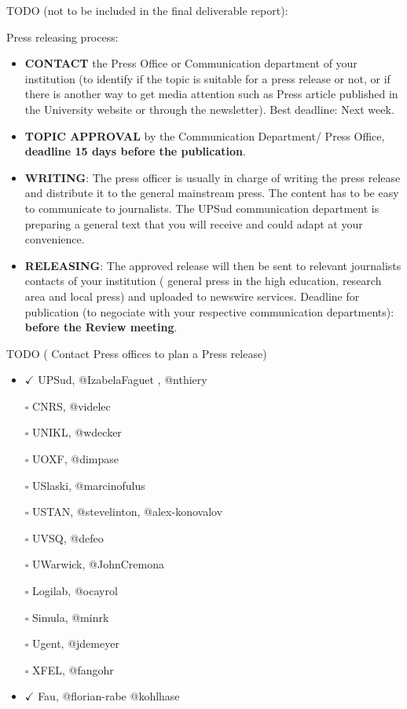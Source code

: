 TODO (not to be included in the final deliverable report):

Press releasing process:

\begin{itemize}
\item
  \textbf{CONTACT} the Press Office or Communication department of your
  institution (to identify if the topic is suitable for a press release
  or not, or if there is another way to get media attention such as
  Press article published in the University website or through the
  newsletter). Best deadline: Next week.
\item
  \textbf{TOPIC APPROVAL} by the Communication Department/ Press Office,
  \textbf{deadline 15 days before the publication}.
\item
  \textbf{WRITING}: The press officer is usually in charge of writing
  the press release and distribute it to the general mainstream press.
  The content has to be easy to communicate to journalists. The UPSud
  communication department is preparing a general text that you will
  receive and could adapt at your convenience.
\item
  \textbf{RELEASING}: The approved release will then be sent to relevant
  journalists contacts of your institution ( general press in the high
  education, research area and local press) and uploaded to newswire
  services. Deadline for publication (to negociate with your respective
  communication departments): \textbf{before the Review meeting}.
\end{itemize}

TODO ( Contact Press offices to plan a Press release)

\begin{itemize}
\tightlist
\item
  \(\checkmark\) UPSud, @IzabelaFaguet , @nthiery
\item[$\square$]
  CNRS, @videlec
\item[$\square$]
  UNIKL, @wdecker
\item[$\square$]
  UOXF, @dimpase
\item[$\square$]
  USlaski, @marcinofulus
\item[$\square$]
  USTAN, @stevelinton, @alex-konovalov
\item[$\square$]
  UVSQ, @defeo
\item[$\square$]
  UWarwick, @JohnCremona
\item[$\square$]
  Logilab, @ocayrol
\item[$\square$]
  Simula, @minrk
\item[$\square$]
  Ugent, @jdemeyer
\item[$\square$]
  XFEL, @fangohr
\item
  \(\checkmark\) Fau, @florian-rabe @kohlhase
\end{itemize}
